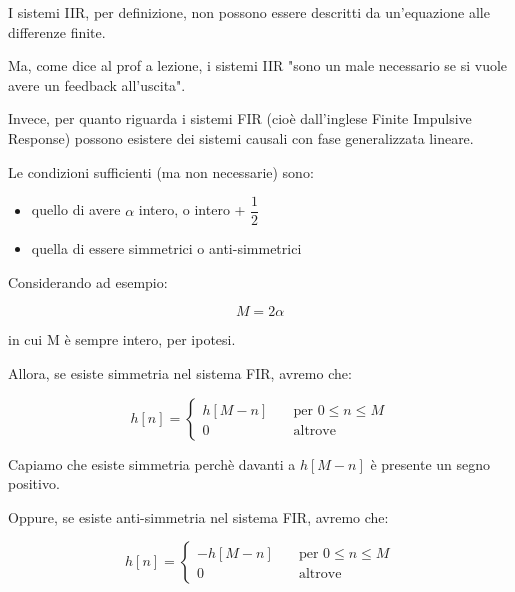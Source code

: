 I sistemi IIR, per definizione, non possono essere descritti da un'equazione alle differenze finite. \newline 

\begin{tcolorbox}
    Ma, come dice al prof a lezione, i sistemi IIR "sono un male necessario se si vuole avere un feedback all'uscita". 
\end{tcolorbox}

Invece, per quanto riguarda i sistemi FIR (cioè dall'inglese Finite Impulsive Response) possono esistere dei sistemi causali con fase generalizzata lineare. \newline 

Le condizioni sufficienti (ma non necessarie) sono: 

\begin{itemize}
    \item quello di avere $\alpha$ intero, o intero + $\dfrac{1}{2}$
    \item quella di essere simmetrici o anti-simmetrici
\end{itemize}

Considerando ad esempio: 

{
    \Large 
    \begin{equation}
        M = 2 \alpha 
    \end{equation}
}

in cui M è sempre intero, per ipotesi. \newline 

Allora, se esiste simmetria nel sistema FIR, avremo che: 

{
    \Large 
    \begin{equation}
        h \left[ n\right]
        = 
        \begin{cases}
            h \left[ M - n\right] \quad &\text{per } 0 \leq n \leq M 
            \\
            0 \quad &\text{altrove }
        \end{cases}
    \end{equation}
}

Capiamo che esiste simmetria perchè davanti a $h \left[ M - n\right]$ è presente un segno positivo. \newline 

Oppure, se esiste anti-simmetria nel sistema FIR, avremo che: 

{
    \Large 
    \begin{equation}
        h \left[ n\right]
        = 
        \begin{cases}
            - h \left[ M - n\right] \quad &\text{per } 0 \leq n \leq M 
            \\
            0 \quad &\text{altrove }
        \end{cases}
    \end{equation}
}

